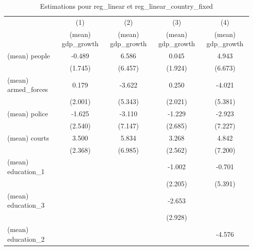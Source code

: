 \begin{table}[htbp]\centering
\def\sym#1{\ifmmode^{#1}\else\(^{#1}\)\fi}
\caption{Estimations pour reg\_linear et reg\_linear\_country\_fixed}
\begin{tabular}{l*{4}{c}}
\hline\hline
                    &\multicolumn{1}{c}{(1)}&\multicolumn{1}{c}{(2)}&\multicolumn{1}{c}{(3)}&\multicolumn{1}{c}{(4)}\\
                    &\multicolumn{1}{c}{(mean) gdp\_growth}&\multicolumn{1}{c}{(mean) gdp\_growth}&\multicolumn{1}{c}{(mean) gdp\_growth}&\multicolumn{1}{c}{(mean) gdp\_growth}\\
\hline
(mean) people       &      -0.489         &       6.586         &       0.045         &       4.943         \\
                    &     (1.745)         &     (6.457)         &     (1.924)         &     (6.673)         \\
[1em]
(mean) armed\_forces &       0.179         &      -3.622         &       0.250         &      -4.021         \\
                    &     (2.001)         &     (5.343)         &     (2.021)         &     (5.381)         \\
[1em]
(mean) police       &      -1.625         &      -3.110         &      -1.229         &      -2.923         \\
                    &     (2.540)         &     (7.147)         &     (2.685)         &     (7.227)         \\
[1em]
(mean) courts       &       3.500         &       5.834         &       3.268         &       4.842         \\
                    &     (2.368)         &     (6.985)         &     (2.562)         &     (7.200)         \\
[1em]
(mean) education\_1  &                     &                     &      -1.002         &      -0.701         \\
                    &                     &                     &     (2.205)         &     (5.391)         \\
[1em]
(mean) education\_3  &                     &                     &      -2.653         &                     \\
                    &                     &                     &     (2.928)         &                     \\
[1em]
(mean) education\_2  &                     &                     &                     &      -4.576         \\

\end{tabular}
\end{table}
